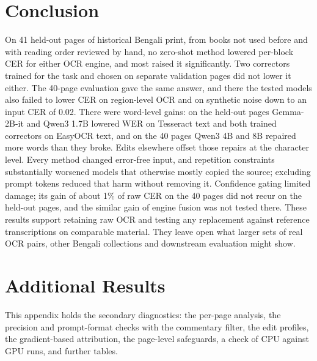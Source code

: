 \documentclass[conference]{IEEEtran}
\begin{document}
\section{Conclusion}

On 41 held-out pages of historical Bengali print, from books not used before and with reading order reviewed by hand, no zero-shot method lowered per-block CER for either OCR engine, and most raised it significantly. Two correctors trained for the task and chosen on separate validation pages did not lower it either. The 40-page evaluation gave the same answer, and there the tested models also failed to lower CER on region-level OCR and on synthetic noise down to an input CER of 0.02. There were word-level gains: on the held-out pages Gemma-2B-it and Qwen3 1.7B lowered WER on Tesseract text and both trained correctors on EasyOCR text, and on the 40 pages Qwen3 4B and 8B repaired more words than they broke. Edits elsewhere offset those repairs at the character level. Every method changed error-free input, and repetition constraints substantially worsened models that otherwise mostly copied the source; excluding prompt tokens reduced that harm without removing it. Confidence gating limited damage; its gain of about 1\% of raw CER on the 40 pages did not recur on the held-out pages, and the similar gain of engine fusion was not tested there. These results support retaining raw OCR and testing any replacement against reference transcriptions on comparable material. They leave open what larger sets of real OCR pairs, other Bengali collections and downstream evaluation might show.

\appendices
\section{Additional Results}
This appendix holds the secondary diagnostics: the per-page analysis, the precision and prompt-format checks with the commentary filter, the edit profiles, the gradient-based attribution, the page-level safeguards, a check of CPU against GPU runs, and further tables.
\end{document}
